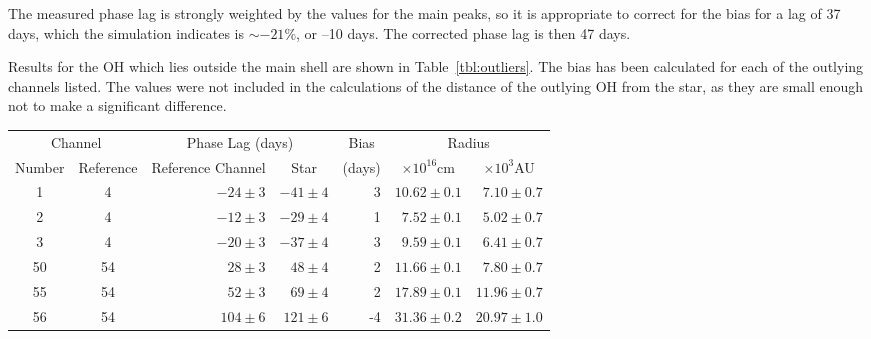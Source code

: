 \documentclass[usenatbib,usegraphicx]{mn2e}
\begin{document}
The measured phase lag is strongly weighted by the values for the main
peaks, so it is appropriate to correct for the bias for a lag of 37 days,
which the simulation indicates is $\sim-21\%$, or --10 days.  The corrected
phase lag is then 47 days.

Results for the OH which lies outside the main shell are shown in
Table~\ref{tbl:outliers}.  The bias has been calculated for each of the
outlying channels listed.  The values were not included in the calculations
of the distance of the outlying OH from the star, as they are small enough
not to make a significant difference.


\begin{table*}

\caption{Outlying OH in OH357.3--1.3.}
\label{tbl:outliers}

\begin{tabular}{|c|c|r|r|r|r|r|}

\hline

\multicolumn{2}{c}{Channel} &
\multicolumn{2}{c}{Phase Lag (days)} &
\multicolumn{1}{c}{Bias} &
\multicolumn{2}{c}{Radius} \\

\multicolumn{1}{c}{Number} &
\multicolumn{1}{c}{Reference} &
\multicolumn{1}{c}{Reference Channel} &
\multicolumn{1}{c}{Star} &
\multicolumn{1}{c}{(days)} &
\multicolumn{1}{c}{$\times10^{16}$cm} &
\multicolumn{1}{c}{$\times10^{3}$AU} \\


\hline

1 & 4 & $-24\pm3$ & $-41\pm4$ & 3 & 
 $10.62\pm0.1$ & $7.10\pm0.7$ \\
2 & 4 & $-12\pm3$ & $-29\pm4$ & 1 &
 $7.52\pm0.1$ & $5.02\pm0.7$ \\
3 & 4 & $-20\pm3$ & $-37\pm4$ & 3 &
 $9.59\pm0.1$ & $6.41\pm0.7$ \\
50 & 54 & $28\pm3$ & $48\pm4$ & 2 &
 $11.66\pm0.1$ & $7.80\pm0.7$ \\
55 & 54 & $52\pm3$ & $69\pm4$ & 2 &
 $17.89\pm0.1$ & $11.96\pm0.7$ \\
56 & 54 & $104\pm6$ & $121\pm6$ & -4 &
 $31.36\pm0.2$ & $20.97\pm1.0$ \\

\hline

\end{tabular}
\end{table*}
\end{document}
